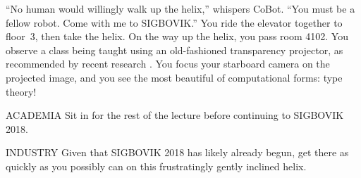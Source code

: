 ``No human would willingly walk up the helix,'' whispers CoBot.
``You must be a fellow robot. Come with me to SIGBOVIK.''
You ride the elevator together to floor~3,
then take the helix.
On the way up the helix, you pass room 4102.
You observe a class being taught using
an old-fashioned transparency projector,
as recommended by recent research \citep{ryan}.
You focus your starboard camera on the projected image,
and you see the most beautiful of computational forms:
type theory!

\begin{switch}
\item{ACADEMIA}
  Sit in for the rest of the lecture before continuing to SIGBOVIK 2018.
\item{INDUSTRY}
  Given that SIGBOVIK 2018 has likely already begun,
  get there as quickly as you possibly can
  on this frustratingly gently inclined helix.
\end{switch}


